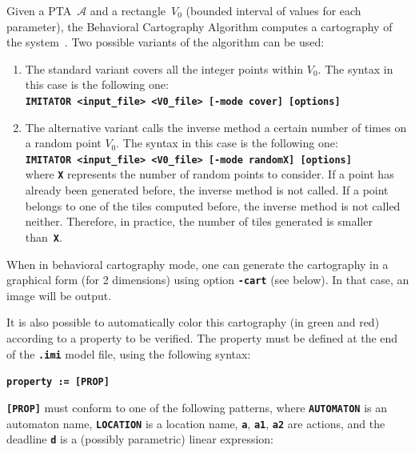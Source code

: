\documentclass[a4paper,11pt]{article}
\newcommand{\A}{\mathcal{A}}
\newcommand{\imitatorExec}{\code{IMITATOR}}
\newcommand{\code}[1]{\textbf{\texttt{#1}}}
\begin{document}
Given a PTA~$\A$ and a rectangle~$V_0$ (bounded interval of values for each parameter), the Behavioral Cartography Algorithm computes a cartography of the system~\cite{af10}.
Two possible variants of the algorithm can be used:
\begin{enumerate}
	\item The standard variant covers all the integer points within $V_0$.
	The syntax in this case is the following one:\\
	\code{\imitatorExec{} <input\_file> <V0\_file> [-mode cover] [options]}

	\item The alternative variant calls the inverse method a certain number of times on a random point $V_0$.
	The syntax in this case is the following one:\\
	\code{\imitatorExec{} <input\_file> <V0\_file> [-mode randomX] [options]}\\
	where \code{X} represents the number of random points to consider.
	If a point has already been generated before, the inverse method is not called.
	If a point belongs to one of the tiles computed before, the inverse method is not called neither.
	Therefore, in practice, the number of tiles generated is smaller than~\code{X}.
\end{enumerate}

When in behavioral cartography mode, one can generate the cartography in a graphical form (for 2 dimensions) using option \code{-cart} (see below).
In that case, an image will be output.

It is also possible to automatically color this cartography (in green and red) according to a property to be verified.
The property must be defined at the end of the \code{.imi} model file, using the following syntax:

\code{property := [PROP]}

\code{[PROP]} must conform to one of the following patterns, where \code{AUTOMATON} is an automaton name, \code{LOCATION} is a location name, \code{a}, \code{a1}, \code{a2} are actions, and the deadline \code{d} is a (possibly parametric) linear expression:
\end{document}
